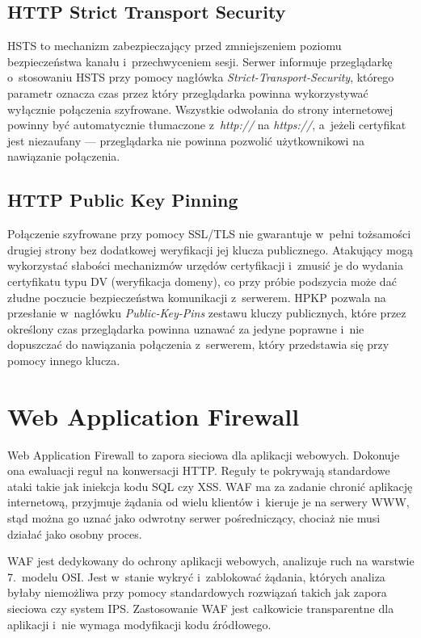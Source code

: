 \documentclass[12pt,a4paper,polish,thesis]{dcsbook}
\begin{document}
\subsection{HTTP Strict Transport Security}
HSTS to mechanizm zabezpieczający przed zmniejszeniem poziomu bezpieczeństwa kanału i~przechwyceniem sesji. Serwer informuje przeglądarkę o~stosowaniu HSTS przy pomocy nagłówka \textit{Strict-Transport-Security}, którego parametr oznacza czas przez który przeglądarka powinna wykorzystywać wyłącznie połączenia szyfrowane. Wszystkie odwołania do strony internetowej powinny być automatycznie tłumaczone z~\textit{http://} na \textit{https://}, a~jeżeli certyfikat jest niezaufany --- przeglądarka nie powinna pozwolić użytkownikowi na nawiązanie połączenia.

\subsection{HTTP Public Key Pinning}
Połączenie szyfrowane przy pomocy SSL/TLS nie gwarantuje w~pełni tożsamości drugiej strony bez dodatkowej weryfikacji jej klucza publicznego. Atakujący mogą wykorzystać słabości mechanizmów urzędów certyfikacji i~zmusić je do wydania certyfikatu typu DV (weryfikacja domeny), co przy próbie podszycia może dać złudne poczucie bezpieczeństwa komunikacji z~serwerem. HPKP pozwala na przesłanie w~nagłówku \textit{Public-Key-Pins} zestawu kluczy publicznych, które przez określony czas przeglądarka powinna uznawać za jedyne poprawne i~nie dopuszczać do nawiązania połączenia z~serwerem, który przedstawia się przy pomocy innego klucza.

\section{Web Application Firewall}
\label{waf}
Web Application Firewall to zapora sieciowa dla aplikacji webowych. Dokonuje ona ewaluacji reguł na konwersacji HTTP. Reguły te pokrywają standardowe ataki takie jak iniekcja kodu SQL czy XSS. WAF ma za zadanie chronić aplikację internetową, przyjmuje żądania od wielu klientów i~kieruje je na serwery WWW, stąd można go uznać jako odwrotny serwer pośredniczący, chociaż nie musi działać jako osobny proces.

WAF jest dedykowany do ochrony aplikacji webowych, analizuje ruch na warstwie 7.~modelu OSI. Jest w~stanie wykryć i~zablokować żądania, których analiza byłaby niemożliwa przy pomocy standardowych rozwiązań takich jak zapora sieciowa czy system IPS. Zastosowanie WAF jest całkowicie transparentne dla aplikacji i~nie wymaga modyfikacji kodu źródłowego.
\end{document}
